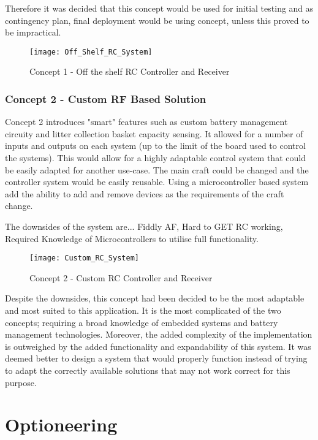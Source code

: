 \documentclass [11pt]{article}
\begin{document}
Therefore it was decided that this concept would be used for initial testing and as contingency plan, final deployment would be using concept, unless this proved to be impractical. 

\begin{figure}[H]
\centerline{\texttt{[image: Off\_Shelf\_RC\_System]}}
\caption{Concept 1 - Off the shelf RC Controller and Receiver}
\label{fig:Custom_RC_System}
\end{figure} 


\subsubsection{Concept 2 - Custom RF Based Solution} \label{sec:concept_2}

Concept 2 introduces "smart" features such as custom battery management circuity and litter collection basket capacity sensing. It allowed for a number of inputs and outputs on each system (up to the limit of the board used to control the systems). This would allow for a highly adaptable control system that could be easily adapted for another use-case. The main craft could be changed and the controller system would be easily reusable. Using a microcontroller based system add the ability to add and remove devices as the requirements of the craft change.

The downsides of the system are... Fiddly AF, Hard to GET RC working, Required Knowledge of Microcontrollers to utilise full functionality.  

\begin{figure}[H]
\centerline{\texttt{[image: Custom\_RC\_System]}}
\caption{Concept 2 - Custom RC Controller and Receiver}
\label{fig:Custom_RC_System}
\end{figure} 

Despite the downsides, this concept had been decided to be the most adaptable and most suited to this application. It is the most complicated of the two concepts; requiring a broad knowledge of embedded systems and battery management technologies. Moreover, the added complexity of the implementation is outweighed by the added functionality and expandability of this system. It was deemed better to design a system that would properly function instead of trying to adapt the correctly available solutions that may not work correct for this purpose.

\section{Optioneering}
\end{document}
